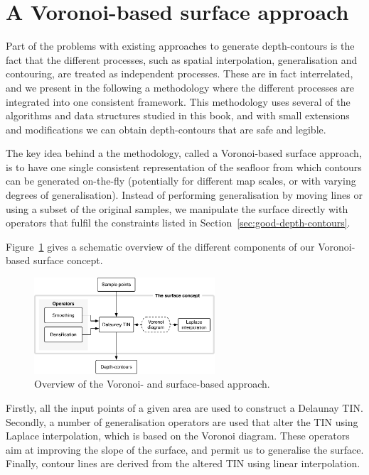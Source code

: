 %
\section{A Voronoi-based surface approach}

Part of the problems with existing approaches to generate depth-contours is the fact that the different processes, such as spatial interpolation, generalisation and contouring, are treated as independent processes.
These are in fact interrelated, and we present in the following a methodology where the different processes are integrated into one consistent framework.
This methodology uses several of the algorithms and data structures studied in this book, and with small extensions and modifications we can obtain depth-contours that are safe and legible.

%

The key idea behind a the methodology, called a Voronoi-based surface approach, is to have one single consistent representation of the seafloor from which contours can be generated on-the-fly (potentially for different map scales, or with varying degrees of generalisation).
Instead of performing generalisation by moving lines or using a subset of the original samples, we manipulate the surface directly with operators that fulfil the constraints listed in Section~\ref{sec:good-depth-contours}.

%

Figure~\ref{fig:surfapproach} gives a schematic overview of the different components of our Voronoi-based surface concept. 
\begin{figure}
  \centering
  \includegraphics[width=0.6\textwidth]{figs/surfaceapproach_V2.pdf}
  \caption{Overview of the Voronoi- and surface-based approach.}
\label{fig:surfapproach}
\end{figure}

Firstly, all the input points of a given area are used to construct a Delaunay TIN.
Secondly, a number of generalisation operators are used that alter the TIN using Laplace interpolation, which is based on the Voronoi diagram.
These operators aim at improving the slope of the surface, and permit us to generalise the surface.
Finally, contour lines are derived from the altered TIN using linear interpolation.


